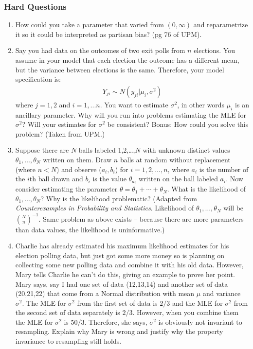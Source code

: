 \documentclass[11pt]{article}
\begin{document}
\subsubsection{Hard Questions}
\begin{enumerate}
\item How could you take a parameter that varied from $(0, \infty)$ and reparametrize it so it could be interpreted as partisan bias?  (pg 76 of UPM). 
\item Say you had data on the outcomes of two exit polls from $n$ elections.  You assume in your model that each election the outcome has a different mean, but the variance between elections is the same.  Therefore, your model specification is:
\begin{eqnarray*}
Y_{ji} \sim N(y_{ji}|\mu_i, \sigma^2)
\end{eqnarray*}
where $j=1,2$ and $i=1,...n$.  You want to estimate $\sigma^2$, in other words $\mu_i$ is an ancillary parameter.  Why will you run into problems estimating the MLE for $\sigma^2$?  Will your estimates for $\sigma^2$ be consistent?  Bonus:  How could you solve this problem? (Taken from UPM.) 
\item Suppose there are $N$ balls labeled 1,2,\ldots,$N$ with unknown distinct values $\theta_1,\ldots,\theta_N$ written on them.  Draw $n$ balls at random without replacement (where $n < N$) and observe ($a_i,b_i$) for $i=1,2,\ldots,n$, where $a_i$ is the number of the $i$th ball drawn and $b_i$ is the value $\theta_{a_i}$ written on the ball labeled $a_i$.  Now consider estimating the parameter $\theta = \theta_1 + \cdots+ \theta_N$.  What is the likelihood of $\theta_1, \ldots, \theta_N$?   Why is the likelihood problematic?  (Adapted from \emph{Counterexamples in Probability and Statistics}.  Likelihood of $\theta_1,\ldots,\theta_N$ will be ${N \choose n}^{-1}$.  Same problem as above exists -- because there are more parameters than data values, the likelihood is uninformative.)  
\item Charlie has already estimated his maximum likelihood estimates for his election polling data, but just got some more money so is planning on collecting some new polling data and combine it with his old data.  However, Mary tells Charlie he can't do this, giving an example to prove her point. Mary says, say I had one set of data (12,13,14) and another set of data (20,21,22) that come from a Normal distribution with mean $\mu$ and variance $\sigma^2$.  The MLE for $\sigma^2$ from the first set of data is $2/3$ and the MLE for $\sigma^2$ from the second set of data separately is $2/3$. However, when you combine them the MLE for $\sigma^2$ is $50/3$.  Therefore, she says, $\sigma^2$ is obviously not invariant to resampling.   Explain why Mary is wrong and justify why the property invariance to resampling still holds.  

\end{enumerate}
\end{document}
